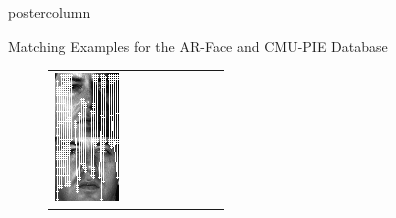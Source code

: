 \documentclass[final,hyperref={pdfpagelabels=false}]{beamer}
\begin{document}
\begin{frame}
\begin{columns}
\begin{column}{.49\textwidth}
\begin{beamercolorbox}[center,wd=\textwidth]{postercolumn}
\begin{minipage}[T]{.95\textwidth}
{\begin{block}{Matching Examples for the AR-Face and CMU-PIE Database}
\begin{figure}
\begin{tabular}{p{.09\linewidth} | p{.12\linewidth} | p{.12\linewidth} | p{.12\linewidth} || p{.12\linewidth} | p{.12\linewidth} | p{.12\linewidth} | p{.09\linewidth} }
                  \includegraphics[width=1.0\linewidth]{paper/bmvc09-surf/figures/matchings/cmupie-usurf/grid_07-27-22.pgm--07-27-08}
                  &

\end{tabular}
\end{figure}
\end{block}}
\end{minipage}
\end{beamercolorbox}
\end{column}
\end{columns}
\end{frame}
\end{document}
